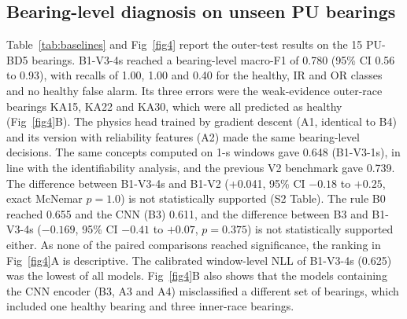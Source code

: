 \documentclass[10pt,letterpaper]{article}
\begin{document}
\subsection*{Bearing-level diagnosis on unseen PU bearings}
Table~\ref{tab:baselines} and Fig~\ref{fig4} report the outer-test results on the 15 PU-BD5 bearings. B1-V3-4s reached a bearing-level macro-F1 of 0.780 (95\% CI 0.56 to 0.93), with recalls of 1.00, 1.00 and 0.40 for the healthy, IR and OR classes and no healthy false alarm. Its three errors were the weak-evidence outer-race bearings KA15, KA22 and KA30, which were all predicted as healthy (Fig~\ref{fig4}B). The physics head trained by gradient descent (A1, identical to B4) and its version with reliability features (A2) made the same bearing-level decisions. The same concepts computed on 1-s windows gave 0.648 (B1-V3-1s), in line with the identifiability analysis, and the previous V2 benchmark gave 0.739. The difference between B1-V3-4s and B1-V2 (+0.041, 95\% CI $-0.18$ to $+0.25$, exact McNemar $p = 1.0$) is not statistically supported (S2 Table). The rule B0 reached 0.655 and the CNN (B3) 0.611, and the difference between B3 and B1-V3-4s ($-0.169$, 95\% CI $-0.41$ to $+0.07$, $p = 0.375$) is not statistically supported either. As none of the paired comparisons reached significance, the ranking in Fig~\ref{fig4}A is descriptive. The calibrated window-level NLL of B1-V3-4s (0.625) was the lowest of all models. Fig~\ref{fig4}B also shows that the models containing the CNN encoder (B3, A3 and A4) misclassified a different set of bearings, which included one healthy bearing and three inner-race bearings.
\end{document}

